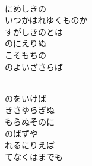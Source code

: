 \documentclass[10pt,b5j]{tarticle} %
\begin{document}
\vspace{1.5em} %
\newcommand{\linespace}{0.5em} %
\newcommand{\blocksize}{0.5\hsize} %
\newcommand{\itemmargin}{3em} %
\begin{enumerate} %
    \setlength{\itemindent}{\itemmargin} %
    \begin{minipage}[c]{\blocksize}
    
        \vspace{\linespace}
        \item~\\
        にめしきの\\
        いつかはれゆくものか\\
        すがしきのとは\\
        のにえりぬ\\
        こそもちの\\
        のよいざさらば
        
        \vspace{\linespace}
        \item~\\
        のをいけば\\
        きさゆらぎぬ\\
        もらぬそのに\\
        のばずや\\
        れるにりえば\\
        てなくはまでも
        
    \end{minipage}
    \begin{minipage}[c]{\blocksize}
        

\end{minipage}
\end{enumerate}
\end{document}
